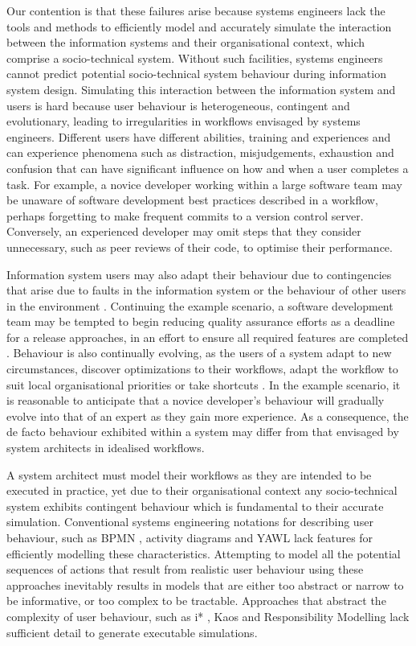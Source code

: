 \documentclass{llncs}
\begin{document}
Our contention is that these failures arise because systems engineers lack the tools and methods to efficiently model
and accurately simulate the interaction between the information systems and their organisational context, which comprise
a socio-technical system. Without such facilities, systems engineers cannot predict potential socio-technical system
behaviour during information system design. Simulating this interaction between the information system and users is hard
because user behaviour is heterogeneous, contingent and evolutionary, leading to irregularities in workflows envisaged by systems engineers.
Different users have different abilities, training and experiences and can experience phenomena such as distraction,
misjudgements, exhaustion and confusion that can have significant influence on how and when a user completes a task.
For example, a novice developer working within a large software team may be unaware of software development best
practices described in a workflow, perhaps forgetting to make frequent commits to a version control server.  Conversely,
an experienced developer may omit steps that they consider unnecessary, such as peer reviews of their code, to optimise
their performance.

Information system users may also adapt their behaviour due to contingencies that arise due to faults in the information
system or the behaviour of other users in the environment \citep{sommerville09deriving}.  Continuing the example
scenario, a software development team may be tempted to begin reducing quality assurance efforts as a deadline for a
release approaches, in an effort to ensure all required features are completed \citep{beck02test}. Behaviour is also
continually evolving, as the users of a system adapt to new circumstances, discover optimizations to their
workflows, adapt the workflow to suit local organisational priorities or take shortcuts \citep{bonen79evolutionary}.  In
the example scenario, it is reasonable to anticipate that a novice developer's behaviour will gradually evolve into that
of an expert as they gain more experience.  As a consequence, the de facto behaviour exhibited within a system may
differ from that envisaged by system architects in idealised workflows.

A system architect must model their workflows as they are intended to be executed in practice, yet due to their
organisational context any socio-technical system exhibits contingent behaviour which is fundamental to their accurate
simulation. Conventional systems engineering notations for describing user behaviour, such as BPMN
\citep{omg2011omgbpmn}, activity diagrams \citep{omg07omguml} and YAWL \citep{hofstede2010yawl} lack features for
efficiently modelling these characteristics.  Attempting to model all the potential sequences of actions that result
from realistic user behaviour using these approaches inevitably results in models that are either too abstract or narrow
to be informative, or too complex to be tractable.  Approaches that abstract the complexity of user behaviour, such as
i* \citep{yu1995social}, Kaos \citep{werneck2009goreistarkaos} and Responsibility Modelling
\citep{sommerville09deriving} lack sufficient detail to generate executable simulations.
\end{document}
